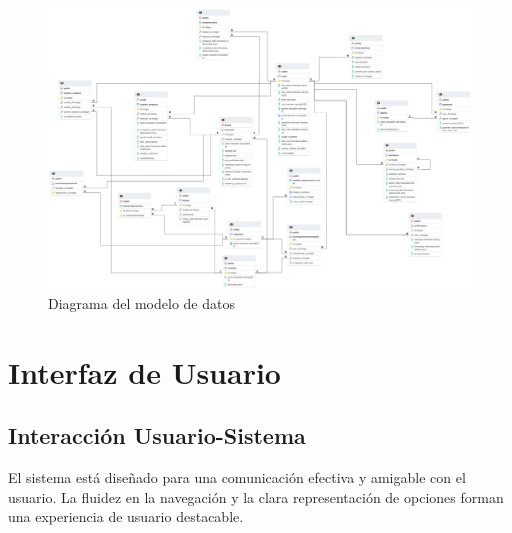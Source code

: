 \newpage

\begin{figure}[H]
    \centering
    \begin{sideways}
        \includegraphics[width=1.8\textwidth]{imagenes/er.png}
    \end{sideways}
    \caption{Diagrama del modelo de datos}
    \label{fig:modeladodedatos}
\end{figure}

\section{Interfaz de Usuario}

\subsection{Interacción Usuario-Sistema}

El sistema está diseñado para una comunicación efectiva y amigable con el usuario. La fluidez en la navegación y la clara representación de opciones forman una experiencia de usuario destacable.

